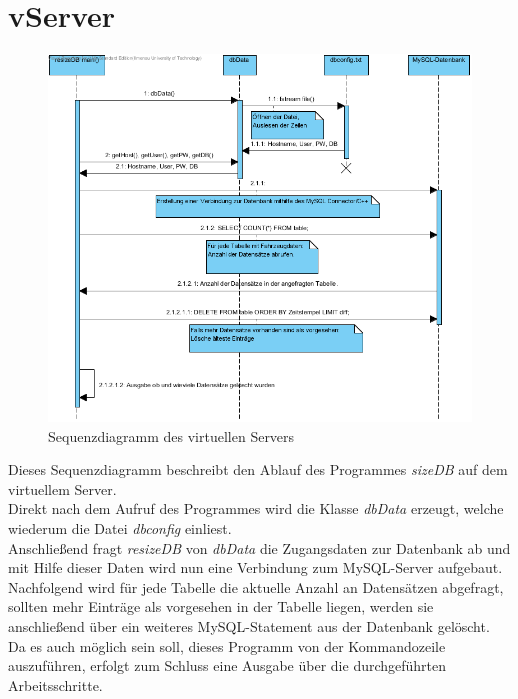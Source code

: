 \documentclass[fontsize = 12pt, paper = a4]{scrreprt}
\begin{document}





\section{vServer}

\begin{figure}[h]
\centering
\includegraphics[scale = 0.75]{resizeDBSequenz}
\caption[Sequenzdiagramm des virtuellen Servers]{Sequenzdiagramm des virtuellen Servers}
\label{resizeDBSequenz}
\end{figure} 

Dieses Sequenzdiagramm beschreibt den Ablauf des Programmes \textit{sizeDB} auf dem virtuellem Server.\\
Direkt nach dem Aufruf des Programmes wird die Klasse \textit{dbData} erzeugt, welche wiederum die Datei \textit{dbconfig} einliest. \\
Anschließend fragt \textit{resizeDB} von \textit{dbData} die Zugangsdaten zur Datenbank ab und mit Hilfe dieser Daten wird nun eine Verbindung zum MySQL-Server aufgebaut.\\
Nachfolgend wird für jede Tabelle die aktuelle Anzahl an Datensätzen abgefragt, sollten mehr Einträge als vorgesehen in der Tabelle liegen, werden sie anschließend über ein weiteres MySQL-Statement aus der Datenbank gelöscht.\\
Da es auch möglich sein soll, dieses Programm von der Kommandozeile auszuführen, erfolgt zum Schluss eine Ausgabe über die durchgeführten Arbeitsschritte.
\end{document}
